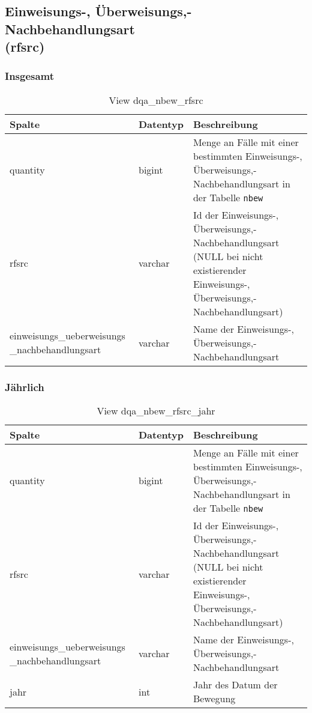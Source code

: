\subsection{Einweisungs-, Überweisungs,- Nachbehandlungsart \\ (rfsrc)} \label{subsec:bewRfsrc}

\subsubsection{Insgesamt} \label{subsubsec:bewRfsrcI}

\begin{table}[ht]
	\centering   
	\caption{View dqa\_nbew\_rfsrc}
	\label{tab:bewRfsrcI}
	\begin{tabular}{||p{5cm}|l|p{8cm}||}   		
		\hline
		Spalte & Datentyp & Beschreibung \\ [0.5ex]
		\hline\hline
		quantity & bigint & Menge an Fälle mit einer bestimmten Einweisungs-, Überweisungs,- Nachbehandlungsart in der Tabelle \texttt{nbew} \\
		\hline
		rfsrc & varchar & Id der Einweisungs-, Überweisungs,- Nachbehandlungsart (NULL bei nicht existierender Einweisungs-, Überweisungs,- Nachbehandlungsart)\\
		\hline
		einweisungs\_ueberweisungs \_nachbehandlungsart & varchar & Name der Einweisungs-, Überweisungs,- Nachbehandlungsart \\
		\hline
	\end{tabular}
\end{table}

\subsubsection{Jährlich} \label{subsubsec:bewRfsrcJ}

\begin{table}[ht]
	\centering   
	\caption{View dqa\_nbew\_rfsrc\_jahr}
	\label{tab:bewRfsrcJ}
	\begin{tabular}{||p{5cm}|l|p{8cm}||}   		
		\hline
		Spalte & Datentyp & Beschreibung \\ [0.5ex]
		\hline\hline
		quantity & bigint & Menge an Fälle mit einer bestimmten Einweisungs-, Überweisungs,- Nachbehandlungsart in der Tabelle \texttt{nbew}\\
		\hline
		rfsrc & varchar & Id der Einweisungs-, Überweisungs,- Nachbehandlungsart (NULL bei nicht existierender Einweisungs-, Überweisungs,- Nachbehandlungsart)\\
		\hline
		einweisungs\_ueberweisungs \_nachbehandlungsart & varchar & Name der Einweisungs-, Überweisungs,- Nachbehandlungsart \\
		\hline
		jahr & int &  Jahr des Datum der Bewegung \\
		\hline		
	\end{tabular}
\end{table}
\newpage
